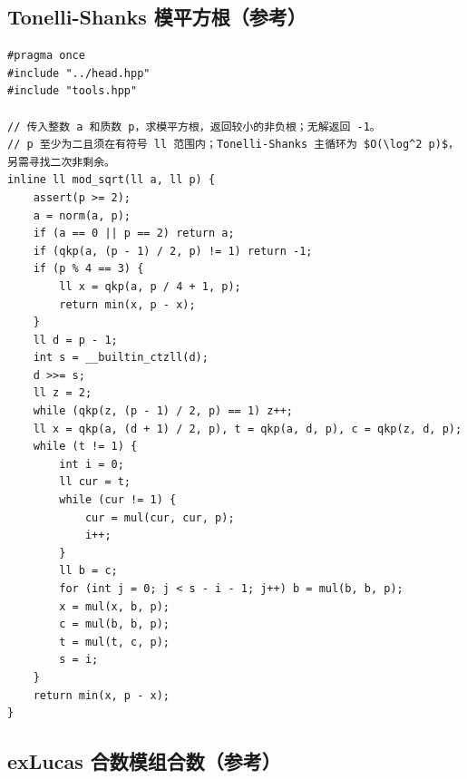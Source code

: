 \subsection{Tonelli-Shanks 模平方根（参考）}
\par

\begin{lstlisting}
#pragma once
#include "../head.hpp"
#include "tools.hpp"

// 传入整数 a 和质数 p，求模平方根，返回较小的非负根；无解返回 -1。
// p 至少为二且须在有符号 ll 范围内；Tonelli-Shanks 主循环为 $O(\log^2 p)$，另需寻找二次非剩余。
inline ll mod_sqrt(ll a, ll p) {
    assert(p >= 2);
    a = norm(a, p);
    if (a == 0 || p == 2) return a;
    if (qkp(a, (p - 1) / 2, p) != 1) return -1;
    if (p % 4 == 3) {
        ll x = qkp(a, p / 4 + 1, p);
        return min(x, p - x);
    }
    ll d = p - 1;
    int s = __builtin_ctzll(d);
    d >>= s;
    ll z = 2;
    while (qkp(z, (p - 1) / 2, p) == 1) z++;
    ll x = qkp(a, (d + 1) / 2, p), t = qkp(a, d, p), c = qkp(z, d, p);
    while (t != 1) {
        int i = 0;
        ll cur = t;
        while (cur != 1) {
            cur = mul(cur, cur, p);
            i++;
        }
        ll b = c;
        for (int j = 0; j < s - i - 1; j++) b = mul(b, b, p);
        x = mul(x, b, p);
        c = mul(b, b, p);
        t = mul(t, c, p);
        s = i;
    }
    return min(x, p - x);
}
\end{lstlisting}

\subsection{exLucas 合数模组合数（参考）}
\par

